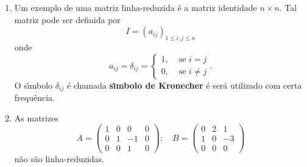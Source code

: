 \begin{exemplo}
	\begin{enumerate}
		\item Um exemplo de uma matriz linha-reduzida \'e a matriz identidade $n \times n$. Tal matriz pode ser definida por
		\[
			I = (a_{ij})_{1 \le i,j \le n}
		\]
		onde
		\[
			a_{ij} = \delta_{ij} = \begin{cases}
										1, & \mbox{ se } i = j\\
										0, & \mbox{ se } i \ne j 
									\end{cases}.
		\]
		O s{\'\i}mbolo $\delta_{ij}$ \'e chamada \textbf{s{\'\i}mbolo de Kronecher} \'e ser\'a utilizado com certa frequ\^encia.
		\item As matrizes
		\[
			A = \begin{pmatrix}
				1 & 0 & 0 & 0\\
				0 & 1 & -1 & 0\\
				0 & 0 & 1 & 0
			\end{pmatrix}; \quad B = \begin{pmatrix}
				0 & 2 & 1\\
				1 & 0 & -3\\
				0 & 0 & 0
			\end{pmatrix}
		\]
		n\~ao s\~ao linha-reduzidas.
	\end{enumerate}
\end{exemplo}

